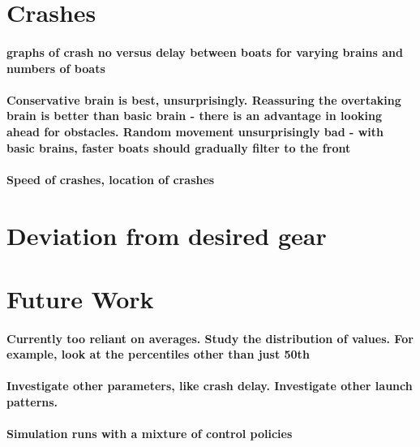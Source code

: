 \section{Crashes}
  \paragraph{graphs of crash no versus delay between boats for varying brains and numbers of boats}
  
  \paragraph{Conservative brain is best, unsurprisingly. Reassuring the overtaking brain is better than basic brain - there is an advantage in looking ahead for obstacles. Random movement unsurprisingly bad - with basic brains, faster boats should gradually filter to the front}

  \paragraph{Speed of crashes, location of crashes}
  
\section{Deviation from desired gear}


\section{Future Work}

\paragraph{Currently too reliant on averages. Study the distribution of values. For example, look at the percentiles other than just 50th}

\paragraph{Investigate other parameters, like crash delay. Investigate other launch patterns.}

\paragraph{Simulation runs with a mixture of control policies}
